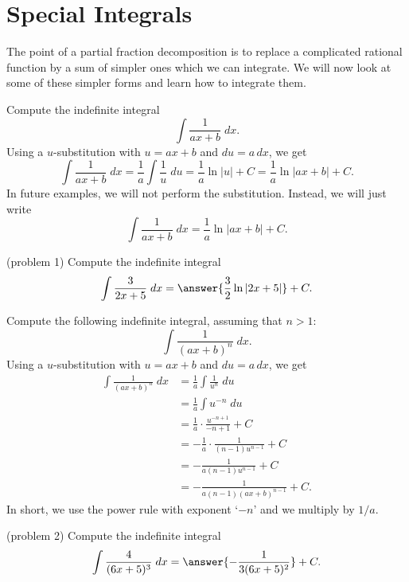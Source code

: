\documentclass{ximera}
\begin{document}
\section{Special Integrals}
The point of a partial fraction decomposition is to replace a complicated rational function by a sum of simpler ones which we can integrate.
We will now look at some of these simpler forms and learn how to integrate them.

\begin{example}[example 1]
Compute the indefinite integral
\[
\int \frac{1}{ax+b} \; dx.
\]
Using a $u$-substitution with $u = ax+b$ and $du = a \, dx$,
we get
\[
\int \frac{1}{ax+b} \; dx = \frac{1}{a} \int \frac{1}{u} \; du = \frac{1}{a} \ln|u| + C = \frac{1}{a} \ln|ax+b| + C.
\]
In future examples, we will not perform the substitution.  Instead, we will just write
\[
\int \frac{1}{ax+b} \; dx = \frac{1}{a} \ln|ax+b| + C.
\]
\end{example}

\begin{problem}(problem 1)
Compute the indefinite integral
\[
\int \frac{3}{2x+5} \; dx = \answer{\frac32 \ln|2x+5|} + C.
\]
\end{problem}

\begin{example}[example 2]
Compute the following indefinite integral, assuming that $n > 1$:
\[
\int \frac{1}{(ax+b)^n} \; dx.
\]
Using a $u$-substitution with $u = ax+b$ and $du = a \, dx$,
we get
\begin{align*}
\int \frac{1}{(ax+b)^n} \; dx &= \frac{1}{a} \int \frac{1}{u^n} \; du \\
                              &= \frac{1}{a} \int u^{-n} \; du \\
                              &= \frac{1}{a} \cdot \frac{u^{-n+1}}{-n+1} + C \\
                              &= -\frac{1}{a} \cdot \frac{1}{(n-1)u^{n-1}} + C\\
                              &= -\frac{1}{a(n-1)u^{n-1}} + C\\
                              &= -\frac{1}{a(n-1)(ax+b)^{n-1}} + C.
\end{align*}
In short, we use the power rule with exponent `$-n$' and we multiply by $1/a$.
\end{example}

\begin{problem}(problem 2)
Compute the indefinite integral
\[
\int \frac{4}{(6x+ 5)^3} \; dx = \answer{-\frac{1}{3(6x+5)^2}} + C.
\]

\end{problem}
\end{document}
